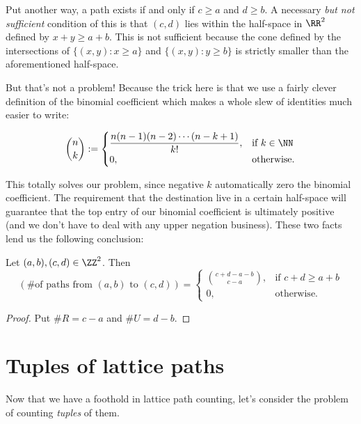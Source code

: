 \documentclass{article}
\begin{document}
Put another way, a path exists if and only if $c \geq a$ and $d \geq b$. 
A necessary \textit{but not sufficient} condition of this is that $(c, d)$ lies within the half-space in $\RR^2$ defined by $x + y \geq a + b$. 
This is not sufficient because the cone defined by the intersections of $\{(x, y): x \geq a\}$ and $\{(x,y): y \geq b\}$ is strictly smaller than the aforementioned half-space.

But that's not a problem! Because the trick here is that we use a fairly clever definition of the binomial coefficient which makes a whole slew of identities much easier to write:


\begin{definition}
    \[
        \binom{n}{k} := \begin{cases}
            \displaystyle\frac{n(n-1)(n-2)\cdots(n-k+1)}{k!}, & \text{if }k\in\NN\\
            0, & \text{otherwise.}
        \end{cases}
    \]
\end{definition}

This totally solves our problem, since negative $k$ automatically zero the binomial coefficient. The requirement that the destination live in a certain half-space will guarantee that the top entry of our binomial coefficient is ultimately positive (and we don't have to deal with any upper negation business). These two facts lend us the following conclusion: 

\begin{proposition}
    Let $(a,b), (c,d) \in \ZZ^2$. Then
    \[
        (\text{\# of paths from }(a,b)\text{ to }(c,d)) = 
        \begin{cases}
            \binom{c+d-a-b}{c-a}, & \text{if }c+d \geq a+b \\
            0, & \text{otherwise.}
        \end{cases}
    \]
\end{proposition}
\begin{proof}
    Put $\#R=c-a$ and $\#U=d-b$. 
\end{proof}

\section{Tuples of lattice paths}

Now that we have a foothold in lattice path counting, let's consider the problem of counting \textit{tuples} of them.
\end{document}
